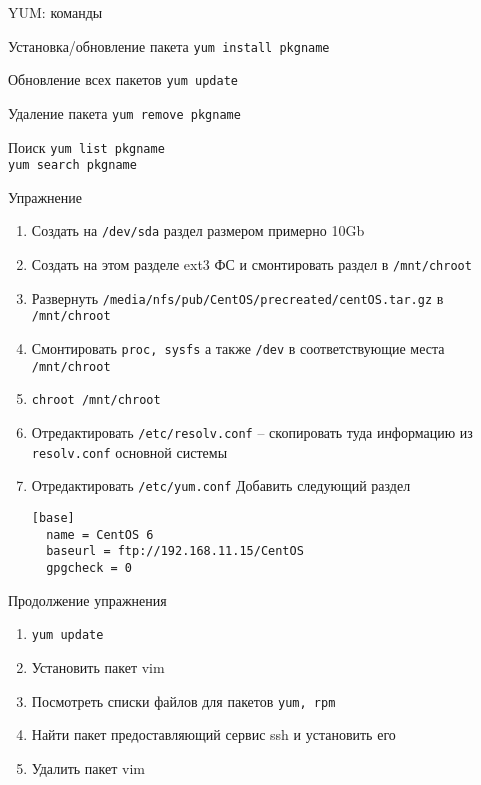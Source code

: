 \begin{frame}{YUM: команды}
	\begin{block}{Установка/обновление пакета}
		{\tt yum install pkgname }
	\end{block}
	\begin{block}{Обновление всех пакетов}
		{\tt yum update }
	\end{block}
	\begin{block}{Удаление пакета}
		{\tt yum remove pkgname }
	\end{block}
	\begin{block}{Поиск}
		{\tt yum list pkgname }\\
		{\tt yum search pkgname }
	\end{block}
\end{frame}


\begin{frame}[fragile]{Упражнение}
  \begin{enumerate}
      \item Создать на {\tt /dev/sda} раздел размером примерно 10Gb
      \item Создать на этом разделе ext3 ФС и смонтировать раздел в {\tt /mnt/chroot}
      \item Развернуть {\tt /media/nfs/pub/CentOS/precreated/centOS.tar.gz} в {\tt /mnt/chroot}
      \item Смонтировать {\tt proc, sysfs} а также {\tt /dev} в соответствующие места {\tt /mnt/chroot}
      \item {\tt chroot /mnt/chroot}
      \item Отредактировать {\tt /etc/resolv.conf} -- скопировать туда информацию из {\tt resolv.conf} основной системы
      \item Отредактировать {\tt /etc/yum.conf} Добавить следующий раздел
\begin{minipage}{0.5\textwidth}
\begin{verbatim}
[base]
  name = CentOS 6
  baseurl = ftp://192.168.11.15/CentOS
  gpgcheck = 0
\end{verbatim}
\end{minipage}
\setcounter{tmpc}{\theenumi}
\end{enumerate}
\end{frame}
\begin{frame}{Продолжение упражнения}
  \begin{enumerate}
      \setcounter{enumi}{\thetmpc}
      \item {\tt yum update}
      \item Установить пакет vim
      \item Посмотреть списки файлов для пакетов {\tt yum, rpm}
      \item Найти пакет предоставляющий сервис ssh и установить его
      \item Удалить пакет vim
    \end{enumerate}
\end{frame}





